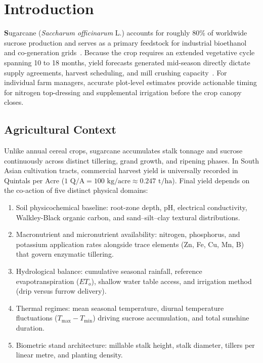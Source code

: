 \documentclass[conference,10pt,letterpaper]{IEEEtran}
\providecommand{\IEEEPARstart}[2]{\textbf{#1}#2}
\begin{document}
\section{Introduction}

\IEEEPARstart{S}{ugarcane} (\textit{Saccharum officinarum} L.) accounts for roughly 80\% of worldwide sucrose production and serves as a primary feedstock for industrial bioethanol and co-generation grids~\cite{canata2024ai}. Because the crop requires an extended vegetative cycle spanning 10 to 18 months, yield forecasts generated mid-season directly dictate supply agreements, harvest scheduling, and mill crushing capacity~\cite{somard2024sugarcane}. For individual farm managers, accurate plot-level estimates provide actionable timing for nitrogen top-dressing and supplemental irrigation before the crop canopy closes.

\subsection{Agricultural Context}
Unlike annual cereal crops, sugarcane accumulates stalk tonnage and sucrose continuously across distinct tillering, grand growth, and ripening phases. In South Asian cultivation tracts, commercial harvest yield is universally recorded in Quintals per Acre ($1\text{ Q/A} = 100\text{ kg/acre} \approx 0.247\text{ t/ha}$). Final yield depends on the co-action of five distinct physical domains:
\begin{enumerate}
    \item Soil physicochemical baseline: root-zone depth, pH, electrical conductivity, Walkley-Black organic carbon, and sand--silt--clay textural distributions.
    \item Macronutrient and micronutrient availability: nitrogen, phosphorus, and potassium application rates alongside trace elements (Zn, Fe, Cu, Mn, B) that govern enzymatic tillering.
    \item Hydrological balance: cumulative seasonal rainfall, reference evapotranspiration ($ET_o$), shallow water table access, and irrigation method (drip versus furrow delivery).
    \item Thermal regimes: mean seasonal temperature, diurnal temperature fluctuations ($T_{\max} - T_{\min}$) driving sucrose accumulation, and total sunshine duration.
    \item Biometric stand architecture: millable stalk height, stalk diameter, tillers per linear metre, and planting density.
\end{enumerate}
\end{document}
